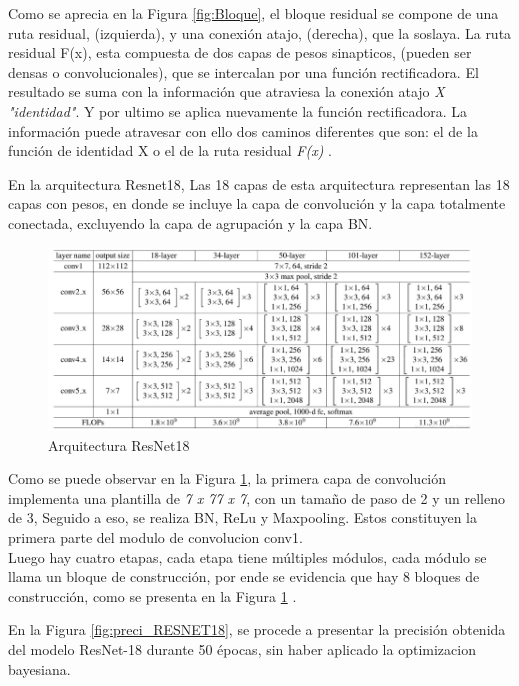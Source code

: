 Como se aprecia en la Figura \ref{fig:Bloque}, el bloque residual se compone de una ruta residual, (izquierda), y una conexión atajo, (derecha), que la soslaya. La ruta residual F(x), esta compuesta de dos capas de pesos sinapticos, (pueden ser densas o convolucionales), que se intercalan por una función rectificadora. El resultado se suma con la información que atraviesa la conexión atajo \textit{X "identidad"}. Y por ultimo se aplica nuevamente la función rectificadora. La información puede atravesar con ello dos caminos diferentes que son: el de la función de identidad X o el de la ruta residual \textit{F(x)} \cite{ref_5}.

\newpage
En la arquitectura Resnet18, Las 18 capas de esta arquitectura representan las 18 capas con pesos, en donde se incluye la capa de convolución y la capa totalmente conectada, excluyendo la capa de agrupación y la capa BN.

\begin{figure}[ht]
	\centering
	\includegraphics[scale=0.65]{Figs/68.png}
	\caption{Arquitectura ResNet18}
	\label{fig:ArqRes18}
\end{figure}


Como se puede observar en la Figura \ref{fig:ArqRes18}, la primera capa de convolución implementa una plantilla de \textit{7 x 77 x 7}, con un tamaño de paso de 2 y un relleno de 3, Seguido a eso, se realiza BN, ReLu y Maxpooling. Estos constituyen la primera parte del modulo de convolucion conv1.\\

Luego hay cuatro etapas, cada etapa tiene múltiples módulos, cada módulo se llama un bloque de construcción, por ende se evidencia que hay 8 bloques de construcción, como se presenta en la Figura \ref{fig:ArqRes18} \cite{ref_5}.				


\newpage	
En la Figura \ref{fig:preci_RESNET18}, se procede a presentar la precisión obtenida del modelo ResNet-18 durante 50 épocas, sin haber aplicado la optimizacion bayesiana.

